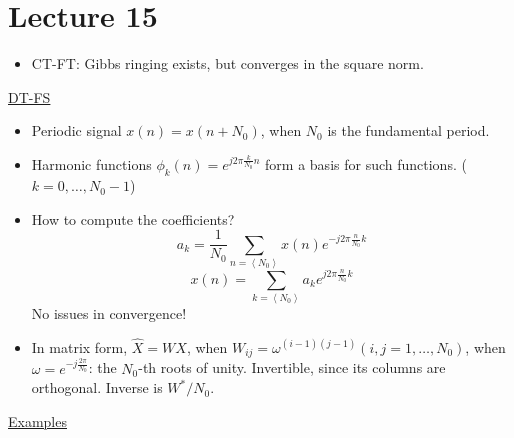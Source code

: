 \documentclass{article}
\begin{document}
\section{Lecture 15}
\begin{itemize}
    \item CT-FT: Gibbs ringing exists, but converges in the square norm.
\end{itemize}
\underline{DT-FS}
\begin{itemize}
    \item Periodic signal $x(n)=x(n+N_0)$, when $N_0$ is the fundamental period.
    \item Harmonic functions $\phi_k(n)=e^{j2\pi\frac{k}{N_0}n}$ form a basis for such functions. ($k=0,\dots,N_0-1$)
    \item How to compute the coefficients?
    \[a_k=\frac{1}{N_0}\sum_{n=\left<N_0\right>}x(n)e^{-j2\pi\frac{n}{N_0}k}\]
    \[x(n)=\sum_{k=\left<N_0\right>}a_ke^{j2\pi \frac{n}{N_0}k}\]
    No issues in convergence!
    \item In matrix form, $\hat{X}=WX$, when $W_{ij}=\omega^{(i-1)(j-1)}(i,j=1,\dots ,N_0)$, when $\omega=e^{-j\frac{2\pi}{N_0}}$: the $N_0$-th roots of unity. Invertible, since its columns are orthogonal. Inverse is $W^*/N_0$.
\end{itemize}
\underline{Examples}
\end{document}
